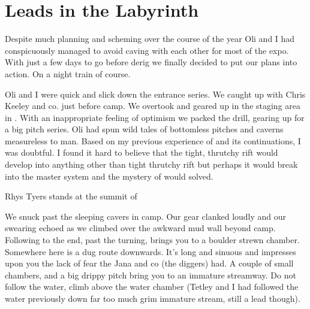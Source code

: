 \section{Leads in the Labyrinth}
 
Despite much planning and scheming over the course of the year Oli and I had conspicuously managed to avoid caving with each other for most of the expo. With just a few days to go before derig we finally decided to put our plans into action. On a night train of course.
 
Oli and I were quick and slick down the entrance series. We caught up with Chris Keeley and co. just before camp. We overtook and geared up in the staging area in . With an inappropriate feeling of optimism we packed the drill, gearing up for a big pitch series. Oli had spun wild tales of bottomless pitches and caverns measureless to man. Based on my previous experience of  and its continuations, I was doubtful. I found it hard to believe that the tight, thrutchy rift would develop into anything other than tight thrutchy rift but perhaps it would break into the master system and the mystery of  would solved. 


 \begin{marginfigure}
\centering
{}
\label{Rhys Skrbina}
\caption{Rhys Tyers stands at the summit of \protect{} }
\end{marginfigure}

 
We snuck past the sleeping cavers in camp. Our gear clanked loudly and our swearing echoed as we climbed over the awkward mud wall beyond camp. Following  to the end, past the  turning, brings you to a boulder strewn chamber. Somewhere here is a dug route downwards. It's long and sinuous and impresses upon you the lack of fear the Jana and co (the diggers) had. A couple of small chambers, and a big drippy pitch bring you to an immature streamway. Do not follow the water, climb above the water chamber (Tetley and I had followed the water previously down far too much grim immature stream, still a lead though). 
 
